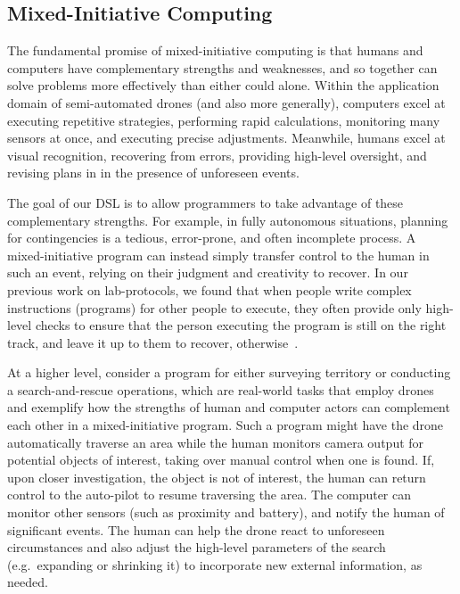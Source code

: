 \documentclass{sig-alternate-05-2015}
\begin{document}
\subsection{Mixed-Initiative Computing}
\label{sec:intro:mic}

The fundamental promise of mixed-initiative computing is that humans and
computers have complementary strengths and weaknesses, and so together can
solve problems more effectively than either could alone.
%
Within the application domain of semi-automated drones (and also more
generally), computers excel at executing repetitive strategies, performing
rapid calculations, monitoring many sensors at once, and executing precise
adjustments. Meanwhile, humans excel at visual recognition, recovering from
errors, providing high-level oversight, and revising plans in in the presence
of unforeseen events.

The goal of our DSL is to allow programmers to take advantage of these
complementary strengths. For example, in fully autonomous situations, planning
for contingencies is a tedious, error-prone, and often incomplete process. A
mixed-initiative program can instead simply transfer control to the human in
such an event, relying on their judgment and creativity to recover.
%
In our previous work on lab-protocols, we found that when people write complex
instructions (programs) for other people to execute, they often provide only
high-level checks to ensure that the person executing the program is still on
the right track, and leave it up to them to recover,
otherwise~\cite{ABW15prog}.

At a higher level, consider a program for either surveying territory or
conducting a search-and-rescue operations, which are real-world tasks that
employ drones and exemplify how the strengths of human and computer actors can
complement each other in a mixed-initiative program. Such a program might have
the drone automatically traverse an area while the human monitors camera output
for potential objects of interest, taking over manual control when one is
found. If, upon closer investigation, the object is not of interest, the human
can return control to the auto-pilot to resume traversing the area. The
computer can monitor other sensors (such as proximity and battery), and notify
the human of significant events. The human can help the drone react to
unforeseen circumstances and also adjust the high-level parameters of the
search (e.g.\ expanding or shrinking it) to incorporate new external
information, as needed.
\end{document}
